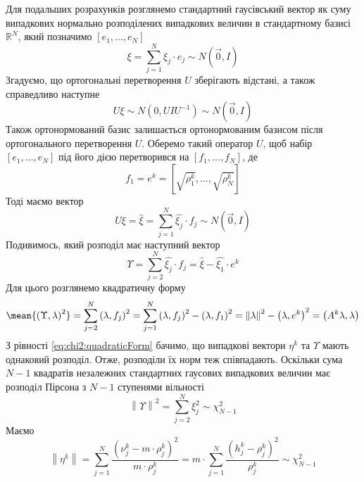 Для подальших розрахунків розглянемо стандартний гаусівський вектор
як суму випадкових нормально розподілених випадкових величин в стандартному
базисі $\mathbb{R}^N$, який позначимо $\left[ e_1, \dots, e_N \right]$
\begin{equation*}
  \xi = \sum_{j=1}^{N}\xi_j \cdot e_j \sim N\left( \vec{0}, I \right)
\end{equation*}
Згадуємо, що ортогональні перетворення $U$ зберігають відстані, а також
справедливо наступне
\begin{equation*}
  U\xi \sim N\left( 0, U I U^{-1} \right) \sim N\left( \vec{0}, I \right)
\end{equation*}
Також ортонормований базис залишається ортонормованим базисом після
ортогонального перетворення $U$.
Оберемо такий оператор $U$, щоб набір $\left[ e_1, \dots, e_N \right]$ під його
дією перетворився на $\left[ f_1, \dots, f_N \right]$, де
\begin{equation*}
  f_1 = e^k = \left[ \sqrt{\rho_1^k}, \dots, \sqrt{\rho_N^k} \right]
\end{equation*}
Тоді маємо вектор
\begin{equation*}
  U\xi
  = \hat{\xi}
  = \sum_{j=1}^{N} \hat{\xi_j} \cdot f_j \sim N\left( \vec{0}, I \right)
\end{equation*}
Подивимось, який розподіл має наступний вектор
\begin{equation*}
  \Upsilon
  = \sum_{j=2}^{N} \hat{\xi_j} \cdot f_j
  = \hat{\xi} - \hat{\xi_1} \cdot e^k
\end{equation*}
Для цього розглянемо квадратичну форму
\begin{equation*}
  \mean{\left( \Upsilon, \lambda \right)^2}
  = \sum_{j=2}^{N} \left( \lambda, f_j \right)^2
  = \sum_{j=1}^{N} \left( \lambda, f_j \right)^2 - \left( \lambda, f_1 \right)^2
  = \left\| \lambda \right\|^2 - \left( \lambda, e^k \right)^2
  = \left( A^k \lambda, \lambda \right)
\end{equation*}
З рівності \eqref{eq:chi2:quadraticForm} бачимо, що випадкові вектори $\eta^k$
та $\Upsilon$ мають однаковий розподіл.
Отже, розподіли їх норм теж співпадають.
Оскільки сума $N-1$ квадратів незалежних стандартних гаусових випадкових
величин має розподіл Пірсона з $N-1$ ступенями вільності
\begin{equation*}
  \left\| \Upsilon \right\|^2 = \sum_{j=2}^{N} \xi_j^2 \sim \chi_{N-1}^2
\end{equation*}
Маємо
\begin{equation*}
  \left\| \eta^k \right\|
  = \sum_{j=1}^{N}\frac{\left( \nu_j^k - m \cdot \rho_j^k \right)^2}{
    m \cdot \rho_j^k}
  = m \cdot \sum_{j=1}^{N}\frac{\left( h_j^k - \rho_j^k \right)^2}{\rho_j^k}
  \sim \chi_{N-1}^2
\end{equation*}

